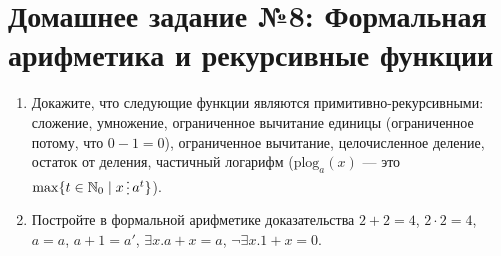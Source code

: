 \documentclass[10pt,a4paper,oneside]{article}
\begin{document}
\section*{Домашнее задание №8: Формальная арифметика и рекурсивные функции}

\begin{enumerate}
\item Докажите, что следующие функции являются примитивно-рекурсивными: сложение, умножение,
ограниченное вычитание единицы (ограниченное потому, что $0-1=0$), ограниченное вычитание,
целочисленное деление, остаток от деления, частичный логарифм 
($\mathrm{plog}_a(x)$ --- это $\max \{t \in \mathbb{N}_0 \mid x \mathop{\raisebox{-2pt}{\vdots}} a^t \}$).

\item Постройте в формальной арифметике доказательства $2+2=4$, $2 \cdot 2 = 4$, $a=a$, 
$a+1=a'$, $\exists x.a+x=a$, $\neg\exists x.1+x=0$.
\end{enumerate}
\end{document}
